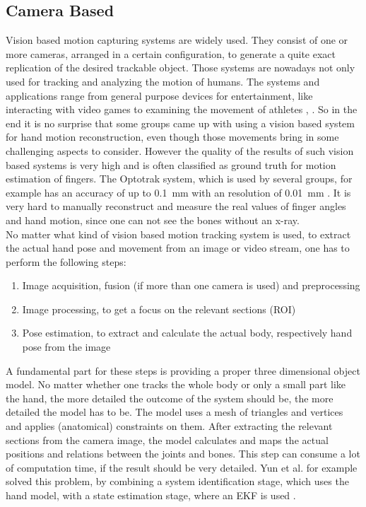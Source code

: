 \subsection{Camera Based} \label{subsec:approaches:vision}
Vision based motion capturing systems are widely used. They consist of one or more cameras, arranged in a certain configuration, to generate a quite exact replication of the desired trackable object. Those systems are nowadays not only used for tracking and analyzing the motion of humans. The systems and applications range from general purpose devices for entertainment, like interacting with video games to examining the movement of athletes \cite{zhang2012microsoft}, \cite{boyd2012situ}. So in the end it is no surprise that some groups came up with using a vision based system for hand motion reconstruction, even though those movements bring in some challenging aspects to consider. However the quality of the results of such vision based systems is very high and is often classified as ground truth for motion estimation of fingers. The Optotrak system, which is used by several groups, for example has an accuracy of up to \SI{0.1}{\mm} with an resolution of \SI{0.01}{\mm} \cite{optotrak}. It is very hard to manually reconstruct and measure the real values of finger angles and hand motion, since one can not see the bones without an x-ray. \\
No matter what kind of vision based motion tracking system is used, to extract the actual hand pose and movement from an image or video stream, one has to perform the following steps:
\begin{enumerate}
\item Image acquisition, fusion (if more than one camera is used) and preprocessing
\item Image processing, to get a focus on the relevant sections (\ac{ROI}) 
\item Pose estimation, to extract and calculate the actual body, respectively hand pose from the image
\end{enumerate}
A fundamental part for these steps is providing a proper three dimensional object model. No matter whether one tracks the whole body or only a small part like the hand, the more detailed the outcome of the system should be, the more detailed the model has to be. The model uses a mesh of triangles and vertices and applies (anatomical) constraints on them. After extracting the relevant sections from the camera image, the model calculates and maps the actual positions and relations between the joints and bones. This step can consume a lot of computation time, if the result should be very detailed. Yun et al. for example solved this problem, by combining a system identification stage, which uses the hand model, with a state estimation stage, where an \ac{EKF} is used \cite{yun2013accurate}.


